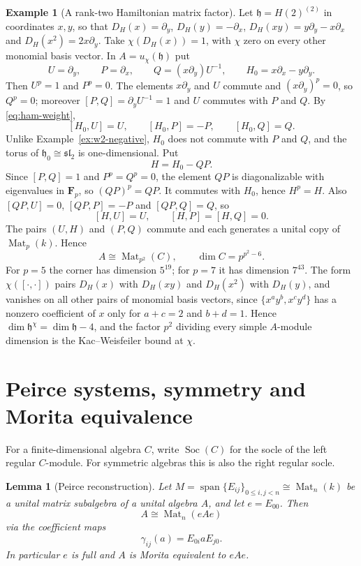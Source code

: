 \documentclass[11pt,reqno]{amsart}
\newtheorem{lemma}[lemma]{Lemma}
\theoremstyle{definition}
\theoremstyle{remark}
\theoremstyle{definition}
\newtheorem{example}[example]{Example}
\newcommand{\Mat}{\operatorname{Mat}}
\newcommand{\Soc}{\operatorname{Soc}}
\newcommand{\spn}{\operatorname{span}}
\newcommand{\Fp}{\mathbf F_p}
\begin{document}
\begin{example}[A rank-two Hamiltonian matrix factor]\label{ex:h2-negative}
Let $\mathfrak h=H(2)^{(2)}$ in coordinates $x,y$, so that
$D_H(x)=\partial_y$, $D_H(y)=-\partial_x$, $D_H(xy)=y\partial_y-x\partial_x$
and $D_H(x^2)=2x\partial_y$. Take $\chi(D_H(x))=1$, with $\chi$ zero on
every other monomial basis vector. In $A=u_\chi(\mathfrak h)$ put
\[
 U=\partial_y,\qquad P=\partial_x,\qquad Q=(x\partial_y)U^{-1},\qquad
 H_0=x\partial_x-y\partial_y .
\]
Then $U^p=1$ and $P^p=0$. The elements $x\partial_y$ and $U$ commute and
$(x\partial_y)^p=0$, so $Q^p=0$; moreover $[P,Q]=\partial_yU^{-1}=1$
and $U$ commutes with $P$ and $Q$. By \eqref{eq:ham-weight},
\[
 [H_0,U]=U,\qquad [H_0,P]=-P,\qquad [H_0,Q]=Q .
\]
Unlike Example~\ref{ex:w2-negative}, $H_0$ does not commute with $P$ and $Q$, and the
torus of $\mathfrak h_0\cong\mathfrak{sl}_2$ is one-dimensional. Put
\[
 H=H_0-QP .
\]
Since $[P,Q]=1$ and $P^p=Q^p=0$, the element $QP$ is diagonalizable with
eigenvalues in $\Fp$, so $(QP)^p=QP$. It commutes with $H_0$, hence
$H^p=H$. Also $[QP,U]=0$, $[QP,P]=-P$ and $[QP,Q]=Q$, so
\[
 [H,U]=U,\qquad [H,P]=[H,Q]=0 .
\]
The pairs $(U,H)$ and $(P,Q)$ commute and each generates a unital copy of
$\Mat_p(k)$. Hence
\[
 A\cong\Mat_{p^2}(C),\qquad \dim C=p^{p^2-6}.
\]
For $p=5$ the corner has dimension $5^{19}$; for $p=7$ it has dimension
$7^{43}$. The form $\chi([\cdot,\cdot])$ pairs $D_H(x)$ with $D_H(xy)$
and $D_H(x^2)$ with $D_H(y)$, and vanishes on all other pairs of monomial
basis vectors, since $\{x^ay^b,x^cy^d\}$ has a nonzero coefficient of $x$
only for $a+c=2$ and $b+d=1$. Hence $\dim\mathfrak h^\chi=\dim\mathfrak h-4$,
and the factor $p^2$ dividing every simple $A$-module dimension is the
Kac--Weisfeiler bound at $\chi$.
\end{example}

\section{Peirce systems, symmetry and Morita equivalence}\label{sec:peirce}

For a finite-dimensional algebra $C$, write $\Soc(C)$ for the socle of the
left regular $C$-module.  For symmetric algebras this is also the right
regular socle.

\begin{lemma}[Peirce reconstruction]\label{lem:peirce}
Let $M=\spn\{E_{ij}\}_{0\le i,j<n}\cong\Mat_n(k)$ be a unital matrix
subalgebra of a unital algebra $A$, and let $e=E_{00}$.  Then
\[
 A\cong\Mat_n(eAe)
\]
via the coefficient maps
\[
 \gamma_{ij}(a)=E_{0i}aE_{j0}.
\]
In particular $e$ is full and $A$ is Morita equivalent to $eAe$.
\end{lemma}
\end{document}
